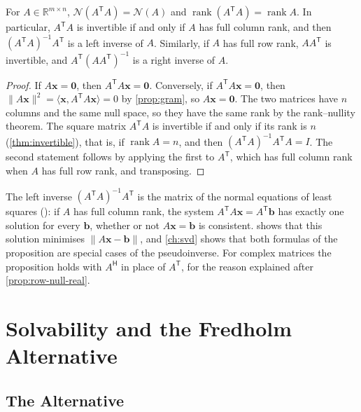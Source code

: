 \begin{proposition}
\label{prop:gram-rank}
For $A\in\mathbb R^{m\times n}$, $\mathcal N(A^{\mathsf T}A)=\mathcal N(A)$ and $\operatorname{rank}(A^{\mathsf T}A)=\operatorname{rank}A$. In particular, $A^{\mathsf T}A$ is invertible if and only if $A$ has full column rank, and then $(A^{\mathsf T}A)^{-1}A^{\mathsf T}$ is a left inverse of $A$. Similarly, if $A$ has full row rank, $AA^{\mathsf T}$ is invertible, and $A^{\mathsf T}(AA^{\mathsf T})^{-1}$ is a right inverse of $A$.
\end{proposition}

\begin{proof}
If $A\mathbf x=\mathbf 0$, then $A^{\mathsf T}A\mathbf x=\mathbf 0$. Conversely, if $A^{\mathsf T}A\mathbf x=\mathbf 0$, then $\|A\mathbf x\|^2=\langle\mathbf x,A^{\mathsf T}A\mathbf x\rangle=0$ by \cref{prop:gram}, so $A\mathbf x=\mathbf 0$. The two matrices have $n$ columns and the same null space, so they have the same rank by the rank--nullity theorem. The square matrix $A^{\mathsf T}A$ is invertible if and only if its rank is $n$ (\cref{thm:invertible}), that is, if $\operatorname{rank}A=n$, and then $(A^{\mathsf T}A)^{-1}A^{\mathsf T}A=I$. The second statement follows by applying the first to $A^{\mathsf T}$, which has full column rank when $A$ has full row rank, and transposing.
\end{proof}

The left inverse $(A^{\mathsf T}A)^{-1}A^{\mathsf T}$ is the matrix of the normal equations of least squares (): if $A$ has full column rank, the system $A^{\mathsf T}A\mathbf x=A^{\mathsf T}\mathbf b$ has exactly one solution for every $\mathbf b$, whether or not $A\mathbf x=\mathbf b$ is consistent.  shows that this solution minimises $\|A\mathbf x-\mathbf b\|$, and \cref{ch:svd} shows that both formulas of the proposition are special cases of the pseudoinverse. For complex matrices the proposition holds with $A^{\mathsf H}$ in place of $A^{\mathsf T}$, for the reason explained after \cref{prop:row-null-real}.

\section{Solvability and the Fredholm Alternative}
\label{sec:fredholm}

\subsection{The Alternative}

